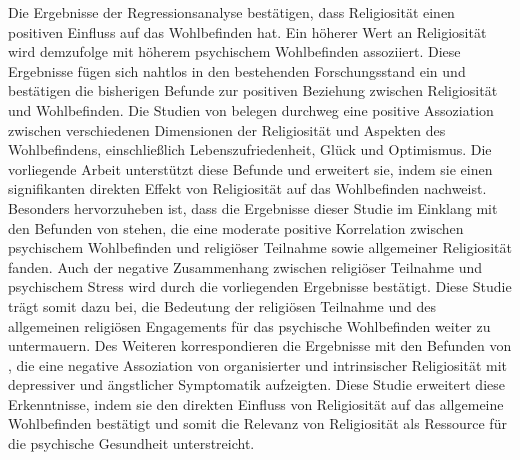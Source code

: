 Die Ergebnisse der Regressionsanalyse bestätigen, dass Religiosität einen positiven Einfluss auf das Wohlbefinden hat. Ein höherer Wert an Religiosität wird demzufolge mit höherem psychischem Wohlbefinden assoziiert.
Diese Ergebnisse fügen sich nahtlos in den bestehenden Forschungsstand ein und bestätigen die bisherigen Befunde zur positiven Beziehung zwischen Religiosität und Wohlbefinden. Die Studien von \textcite{DarIqbal2019, KoenigShohaib2023, VanCapellen2016} belegen durchweg eine positive Assoziation zwischen verschiedenen Dimensionen der Religiosität und Aspekten des Wohlbefindens, einschließlich Lebenszufriedenheit, Glück und Optimismus. Die vorliegende Arbeit unterstützt diese Befunde und erweitert sie, indem sie einen signifikanten direkten Effekt von Religiosität auf das Wohlbefinden nachweist.
Besonders hervorzuheben ist, dass die Ergebnisse dieser Studie im Einklang mit den Befunden von \textcite{Jokela2022} stehen, die eine moderate positive Korrelation zwischen psychischem Wohlbefinden und religiöser Teilnahme sowie allgemeiner Religiosität fanden. Auch der negative Zusammenhang zwischen religiöser Teilnahme und psychischem Stress wird durch die vorliegenden Ergebnisse bestätigt. Diese Studie trägt somit dazu bei, die Bedeutung der religiösen Teilnahme und des allgemeinen religiösen Engagements für das psychische Wohlbefinden weiter zu untermauern.
Des Weiteren korrespondieren die Ergebnisse mit den Befunden von \textcite{FernándezRosell2022}, die eine negative Assoziation von organisierter und intrinsischer Religiosität mit depressiver und ängstlicher Symptomatik aufzeigten. Diese Studie erweitert diese Erkenntnisse, indem sie den direkten Einfluss von Religiosität auf das allgemeine Wohlbefinden bestätigt und somit die Relevanz von Religiosität als Ressource für die psychische Gesundheit unterstreicht.


